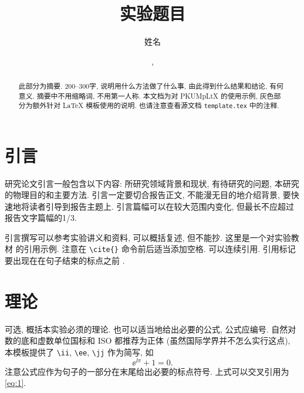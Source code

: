 \documentclass[notofandol]{mpltx}
\newcommand{\note}[1]{{\color{gray}#1}}
\begin{document}
\title{实验题目} %
\author{姓名} %
\makeatletter\date{\mpltx@filedate, \mpltx@fileversion}\makeatother

\begin{abstract}
    此部分为摘要.
    200--300字, 说明用什么方法做了什么事, 由此得到什么结果和结论, 有何意义.
    摘要中不用缩略词, 不用第一人称.
    \note{本文档为对 \textsf{PKUMpLtX} 的使用示例, 灰色部分为额外针对 \LaTeX{} 模板使用的说明.
        也请注意查看源文档 \texttt{template.tex} 中的注释.}
\end{abstract}

\maketitle

\section{引言}

研究论文引言一般包含以下内容:
所研究领域背景和现状,
有待研究的问题,
本研究的物理目的和主要方法.
引言一定要切合报告正文, 不能漫无目的地介绍背景, 要快速地将读者引导到报告主题上.
引言篇幅可以在较大范围内变化, 但最长不应超过报告文字篇幅的1/3.

引言撰写可以参考实验讲义和资料, 可以概括复述, 但不能抄.
\note{这里是一个对实验教材 \cite{jindaishiyan} 的引用示例.}
\note{注意在 \texttt{\textbackslash{}cite\{\}} 命令前后适当添加空格.
    可以连续引用.
    引用标记要出现在在句子结束的标点之前 \cite{jindaishiyan,zamojski2007deep}.}

\section{理论}\label{sec:theory}

可选, 概括本实验必须的理论.
也可以适当地给出必要的公式, 公式应编号.
\note{自然对数的底和虚数单位国标和 ISO 都推荐为正体 (虽然国际学界并不怎么实行这点), 本模板提供了 \texttt{\textbackslash{}ii}, \texttt{\textbackslash{}ee}, \texttt{\textbackslash{}jj} 作为简写, 如
    \begin{equation}\label{eq:1}
        \ee^{\ii\pi}+1=0.
    \end{equation}
    注意公式应作为句子的一部分在末尾给出必要的标点符号.
    上式可以交叉引用为\autoref{eq:1}.}
\end{document}
